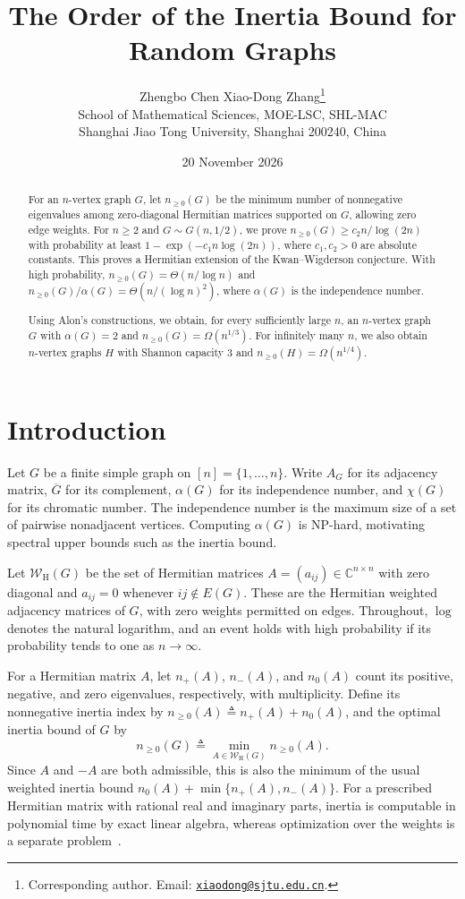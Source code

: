 \documentclass[11pt]{article}
\title{The Order of the Inertia Bound for Random Graphs}
\author{Zhengbo Chen \quad Xiao-Dong Zhang\thanks{Corresponding author.
Email: \href{mailto:xiaodong@sjtu.edu.cn}{\nolinkurl{xiaodong@sjtu.edu.cn}}.}\\[0.5em]
\small School of Mathematical Sciences, MOE-LSC, SHL-MAC\\
\small Shanghai Jiao Tong University, Shanghai 200240, China}
\date{20 November 2026}
\numberwithin{equation}{section}
\theoremstyle{definition}
\theoremstyle{remark}
\newcommand{\C}{\mathbb C}
\newcommand{\W}{\mathcal W_{\mathrm H}}
\begin{document}
\maketitle

\begin{abstract}
For an $n$-vertex graph $G$, let $n_{\geq0}(G)$ be the minimum number
of nonnegative eigenvalues among zero-diagonal Hermitian matrices
supported on $G$, allowing zero edge weights. For $n\geq2$ and
$G\sim G(n,1/2)$, we prove $n_{\geq0}(G)\geq c_2n/\log(2n)$
with probability at least $1-\exp(-c_1n\log(2n))$, where
$c_1,c_2>0$ are absolute constants. This proves a Hermitian extension
of the Kwan--Wigderson conjecture. With high probability,
$n_{\geq0}(G)=\Theta(n/\log n)$ and
$n_{\geq0}(G)/\alpha(G)=\Theta(n/(\log n)^2)$, where $\alpha(G)$
is the independence number.

Using Alon's constructions, we obtain, for every sufficiently large
$n$, an $n$-vertex graph $G$ with $\alpha(G)=2$ and
$n_{\geq0}(G)=\Omega(n^{1/3})$. For infinitely many $n$, we also
obtain $n$-vertex graphs $H$ with Shannon capacity $3$ and
$n_{\geq0}(H)=\Omega(n^{1/4})$.
\end{abstract}

\section{Introduction}\label{sec:introduction}

Let $G$ be a finite simple graph on $[n]=\{1,\ldots,n\}$.
Write $A_G$ for its adjacency matrix, $\overline G$ for its complement,
$\alpha(G)$ for its independence number, and $\chi(G)$ for its
chromatic number. The independence number is the maximum size of a
set of pairwise nonadjacent vertices. Computing $\alpha(G)$ is
NP-hard, motivating spectral upper bounds such as the inertia bound.

Let $\W(G)$ be the set of Hermitian matrices
$A=(a_{ij})\in\C^{n\times n}$ with zero diagonal and $a_{ij}=0$
whenever $ij\notin E(G)$. These are the Hermitian weighted adjacency
matrices of $G$, with zero weights permitted on edges.
Throughout, $\log$ denotes the natural logarithm, and an event
holds with high probability if its probability tends to one as
$n\to\infty$.

For a Hermitian matrix $A$, let $n_+(A)$, $n_-(A)$, and $n_0(A)$
count its positive, negative, and zero eigenvalues, respectively,
with multiplicity. Define its nonnegative inertia index by
$n_{\geq0}(A)\triangleq n_+(A)+n_0(A)$, and the optimal inertia
bound of $G$ by
\begin{equation}\label{eq:inertia-definition}
 n_{\geq0}(G)\triangleq\min_{A\in\W(G)}n_{\geq0}(A).
\end{equation}
Since $A$ and $-A$ are both admissible, this is also the minimum
of the usual weighted inertia bound $n_0(A)+\min\{n_+(A),n_-(A)\}$.
For a prescribed Hermitian matrix with rational real and imaginary
parts, inertia is computable in polynomial time by exact linear
algebra, whereas optimization over the weights is a separate
problem~\cite[Section~1]{KW}.
\end{document}
